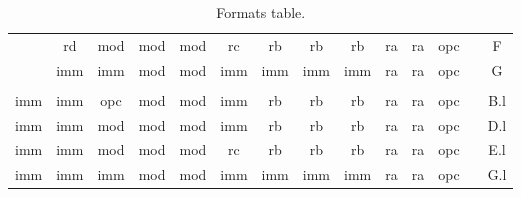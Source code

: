 \begin{table}[hbt!]
\begin{tabular}{c|c|c|c|c|c|c|c|c|c|c|c|r|c|}
\cline{2-12}\cline{14-14}
                                & rd                   & mod                  & mod                  & mod                  & rc                   & rb                    & rb                   & rb                   & ra                   & ra                   & opc                  &                       & F                            \\ 
\cline{2-12}\cline{14-14}
                                & imm                  & imm                  & mod                  & mod                  & imm                  & imm                   & imm                  & imm                  & ra                   & ra                   & opc                  &                       & G                            \\ 
\cline{2-12}\cline{14-14}
\multicolumn{1}{l}{}            & \multicolumn{1}{l}{} & \multicolumn{1}{l}{} & \multicolumn{1}{l}{} & \multicolumn{1}{l}{} & \multicolumn{1}{l}{} & \multicolumn{1}{l}{}  & \multicolumn{1}{l}{} & \multicolumn{1}{l}{} & \multicolumn{1}{l}{} & \multicolumn{1}{l}{} & \multicolumn{1}{l}{} & \multicolumn{1}{l}{}  & \multicolumn{1}{l}{}         \\ 
\cline{1-12}\cline{14-14}
\multicolumn{1}{|c|}{imm}       & imm                  & opc                  & mod                  & mod                  & imm                  & rb                    & rb                   & rb                   & ra                   & ra                   & opc                  &                       & B.l                          \\ 
\cline{1-12}\cline{14-14}
\multicolumn{1}{|c|}{imm}       & imm                  & mod                  & mod                  & mod                  & imm                  & rb                    & rb                   & rb                   & ra                   & ra                   & opc                  &                       & D.l                          \\ 
\cline{1-12}\cline{14-14}
\multicolumn{1}{|c|}{imm}       & imm                  & mod                  & mod                  & mod                  & rc                   & rb                    & rb                   & rb                   & ra                   & ra                   & opc                  &                       & E.l                          \\ 
\cline{1-12}\cline{14-14}
\multicolumn{1}{|c|}{imm}       & imm                  & imm                  & mod                  & mod                  & imm                  & imm                   & imm                  & imm                  & ra                   & ra                   & opc                  &                       & G.l                          \\
\cline{1-12}\cline{14-14}
\end{tabular}
\caption[Formats table]{Formats table.}
\end{table}